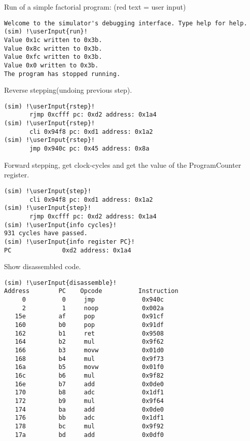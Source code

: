 \begin{block}{\large {}\vphantom{Debugger}}

\newcommand{\userInput}[1]{
	\textcolor{red}{#1}  
}

\tiny {


Run of a simple factorial program: (red text = user input)
\begin{lstlisting}[escapechar=!]
Welcome to the simulator's debugging interface. Type help for help. 
(sim) !\userInput{run}!
Value 0x1c written to 0x3b.
Value 0x8c written to 0x3b.
Value 0xfc written to 0x3b.
Value 0x0 written to 0x3b.
The program has stopped running.
\end{lstlisting}

Reverse stepping(undoing previous step).
\begin{lstlisting}[escapechar=!]
(sim) !\userInput{rstep}!
       rjmp 0xcfff pc: 0xd2 address: 0x1a4
(sim) !\userInput{rstep}!
       cli 0x94f8 pc: 0xd1 address: 0x1a2
(sim) !\userInput{rstep}!
       jmp 0x940c pc: 0x45 address: 0x8a
\end{lstlisting}
Forward stepping, get clock-cycles and get the value of the ProgramCounter register.
\begin{lstlisting}[escapechar=!]
(sim) !\userInput{step}!
       cli 0x94f8 pc: 0xd1 address: 0x1a2
(sim) !\userInput{step}!
       rjmp 0xcfff pc: 0xd2 address: 0x1a4
(sim) !\userInput{info cycles}!
931 cycles have passed.
(sim) !\userInput{info register PC}!
PC              0xd2 address: 0x1a4
\end{lstlisting}

Show disassembled code.
\begin{lstlisting}[escapechar=!]
(sim) !\userInput{disassemble}!
Address        PC    Opcode          Instruction    
     0          0     jmp             0x940c
     2          1     noop            0x002a
   15e         af     pop             0x91cf
   160         b0     pop             0x91df
   162         b1     ret             0x9508
   164         b2     mul             0x9f62
   166         b3     movw            0x01d0
   168         b4     mul             0x9f73
   16a         b5     movw            0x01f0
   16c         b6     mul             0x9f82
   16e         b7     add             0x0de0
   170         b8     adc             0x1df1
   172         b9     mul             0x9f64
   174         ba     add             0x0de0
   176         bb     adc             0x1df1
   178         bc     mul             0x9f92
   17a         bd     add             0x0df0
\end{lstlisting}

}


\end{block}

